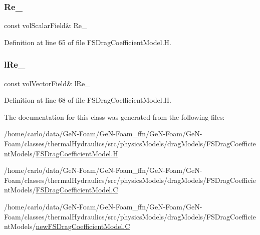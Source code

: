 \subsubsection{\texorpdfstring{Re\+\_\+}{Re\_}}
{\footnotesize\ttfamily const vol\+Scalar\+Field\& Re\+\_\+\hspace{0.3cm}{\ttfamily [protected]}}



Definition at line 65 of file F\+S\+Drag\+Coefficient\+Model.\+H.

\mbox{\label{classFoam_1_1FSDragCoefficientModel_a749dc262c8ea770eb61b5d6302d0a0c6}} 
\subsubsection{\texorpdfstring{l\+Re\+\_\+}{lRe\_}}
{\footnotesize\ttfamily const vol\+Vector\+Field\& l\+Re\+\_\+\hspace{0.3cm}{\ttfamily [protected]}}



Definition at line 68 of file F\+S\+Drag\+Coefficient\+Model.\+H.



The documentation for this class was generated from the following files\+:\begin{DoxyCompactItemize}
\item 
/home/carlo/data/\+Ge\+N-\/\+Foam/\+Ge\+N-\/\+Foam\+\_\+ffn/\+Ge\+N-\/\+Foam/\+Ge\+N-\/\+Foam/classes/thermal\+Hydraulics/src/physics\+Models/drag\+Models/\+F\+S\+Drag\+Coefficient\+Models/\hyperlink{FSDragCoefficientModel_8H}{F\+S\+Drag\+Coefficient\+Model.\+H}\item 
/home/carlo/data/\+Ge\+N-\/\+Foam/\+Ge\+N-\/\+Foam\+\_\+ffn/\+Ge\+N-\/\+Foam/\+Ge\+N-\/\+Foam/classes/thermal\+Hydraulics/src/physics\+Models/drag\+Models/\+F\+S\+Drag\+Coefficient\+Models/\hyperlink{FSDragCoefficientModel_8C}{F\+S\+Drag\+Coefficient\+Model.\+C}\item 
/home/carlo/data/\+Ge\+N-\/\+Foam/\+Ge\+N-\/\+Foam\+\_\+ffn/\+Ge\+N-\/\+Foam/\+Ge\+N-\/\+Foam/classes/thermal\+Hydraulics/src/physics\+Models/drag\+Models/\+F\+S\+Drag\+Coefficient\+Models/\hyperlink{newFSDragCoefficientModel_8C}{new\+F\+S\+Drag\+Coefficient\+Model.\+C}\end{DoxyCompactItemize}
